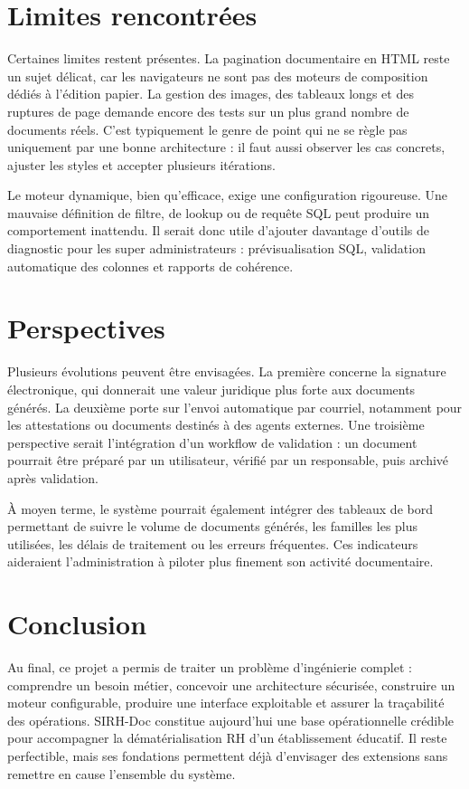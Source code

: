 \section{Limites rencontrées}

Certaines limites restent présentes. La pagination documentaire en HTML reste un sujet délicat, car les navigateurs ne sont pas des moteurs de composition dédiés à l'édition papier. La gestion des images, des tableaux longs et des ruptures de page demande encore des tests sur un plus grand nombre de documents réels. C'est typiquement le genre de point qui ne se règle pas uniquement par une bonne architecture : il faut aussi observer les cas concrets, ajuster les styles et accepter plusieurs itérations.

Le moteur dynamique, bien qu'efficace, exige une configuration rigoureuse. Une mauvaise définition de filtre, de lookup ou de requête SQL peut produire un comportement inattendu. Il serait donc utile d'ajouter davantage d'outils de diagnostic pour les super administrateurs : prévisualisation SQL, validation automatique des colonnes et rapports de cohérence.

\section{Perspectives}

Plusieurs évolutions peuvent être envisagées. La première concerne la signature électronique, qui donnerait une valeur juridique plus forte aux documents générés. La deuxième porte sur l'envoi automatique par courriel, notamment pour les attestations ou documents destinés à des agents externes. Une troisième perspective serait l'intégration d'un workflow de validation : un document pourrait être préparé par un utilisateur, vérifié par un responsable, puis archivé après validation.

À moyen terme, le système pourrait également intégrer des tableaux de bord permettant de suivre le volume de documents générés, les familles les plus utilisées, les délais de traitement ou les erreurs fréquentes. Ces indicateurs aideraient l'administration à piloter plus finement son activité documentaire.

\section{Conclusion}

Au final, ce projet a permis de traiter un problème d'ingénierie complet : comprendre un besoin métier, concevoir une architecture sécurisée, construire un moteur configurable, produire une interface exploitable et assurer la traçabilité des opérations. SIRH-Doc constitue aujourd'hui une base opérationnelle crédible pour accompagner la dématérialisation RH d'un établissement éducatif. Il reste perfectible, mais ses fondations permettent déjà d'envisager des extensions sans remettre en cause l'ensemble du système.
